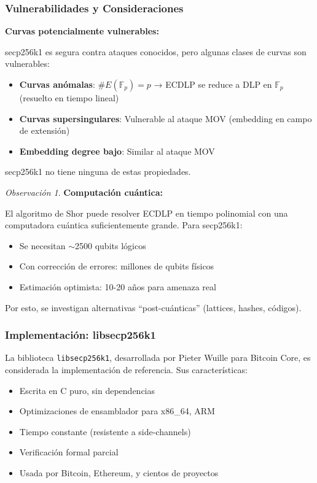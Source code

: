 \documentclass[11pt,a4paper,twoside,openright]{book}
\theoremstyle{definition}
\theoremstyle{plain}
\theoremstyle{remark}
\newtheorem{remark}{Observación}[chapter]
\newcommand{\Fp}{\mathbb{F}_p}
\begin{document}
\subsubsection{Vulnerabilidades y Consideraciones}

\begin{advertencia}
\textbf{Curvas potencialmente vulnerables:}

secp256k1 es segura contra ataques conocidos, pero algunas clases de curvas son vulnerables:

\begin{itemize}
    \item \textbf{Curvas anómalas}: $\#E(\Fp) = p$ → ECDLP se reduce a DLP en $\Fp$ (resuelto en tiempo lineal)
    \item \textbf{Curvas supersingulares}: Vulnerable al ataque MOV (embedding en campo de extensión)
    \item \textbf{Embedding degree bajo}: Similar al ataque MOV
\end{itemize}

secp256k1 no tiene ninguna de estas propiedades.
\end{advertencia}

\begin{remark}
\textbf{Computación cuántica:}

El algoritmo de Shor puede resolver ECDLP en tiempo polinomial con una computadora cuántica suficientemente grande. Para secp256k1:
\begin{itemize}
    \item Se necesitan $\sim$2500 qubits lógicos
    \item Con corrección de errores: millones de qubits físicos
    \item Estimación optimista: 10-20 años para amenaza real
\end{itemize}

Por esto, se investigan alternativas ``post-cuánticas'' (lattices, hashes, códigos).
\end{remark}

\subsubsection{Implementación: libsecp256k1}

\begin{intuicion}
La biblioteca \texttt{libsecp256k1}, desarrollada por Pieter Wuille para Bitcoin Core, es considerada la implementación de referencia. Sus características:
\begin{itemize}
    \item Escrita en C puro, sin dependencias
    \item Optimizaciones de ensamblador para x86\_64, ARM
    \item Tiempo constante (resistente a side-channels)
    \item Verificación formal parcial
    \item Usada por Bitcoin, Ethereum, y cientos de proyectos
\end{itemize}
\end{intuicion}
\end{document}
